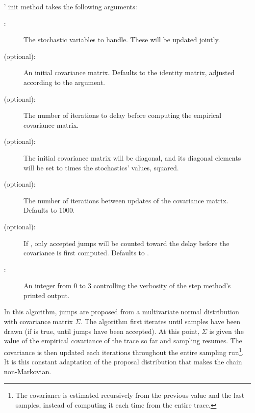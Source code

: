 ' init method takes the following arguments:
\begin{description}
   \item[:] The stochastic variables to handle. These will be updated jointly.
   \item[ (optional):] An initial covariance matrix. Defaults to the identity matrix, adjusted according to the  argument.
   \item[ (optional):] The number of iterations to delay before computing the empirical covariance matrix.
   \item[ (optional):] The initial covariance matrix will be diagonal, and its diagonal elements will be set to  times the stochastics' values, squared.
   \item[ (optional):] The number of iterations between updates of the covariance matrix. Defaults to 1000.
   \item[ (optional):] If , only accepted jumps will be counted toward the delay before the covariance is first computed. Defaults to .
   \item[:] An integer from 0 to 3 controlling the verbosity of the step method's printed output.
\end{description}

In this algorithm, jumps are proposed from a multivariate normal
distribution with covariance matrix $\Sigma$. The algorithm first iterates
until  samples have been drawn (if  is true, until
 jumps have been accepted). At this point, $\Sigma$ is given
the value of the empirical covariance of the trace so far and sampling
resumes. The covariance is then updated each 
iterations throughout the entire sampling run\footnote{The covariance is
estimated recursively from the previous value and the last 
samples, instead of computing it each time from the entire trace.}. It is
this constant adaptation of the proposal distribution that makes the chain
non-Markovian.

